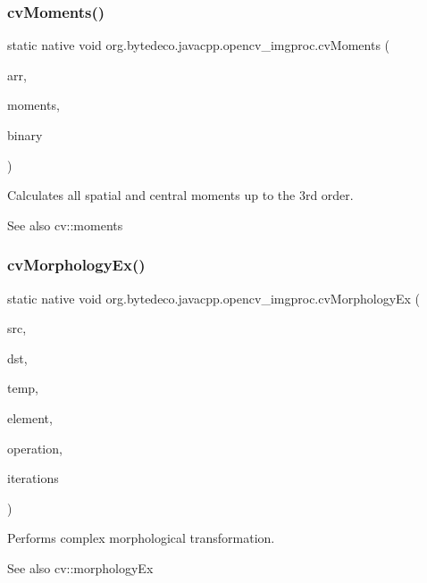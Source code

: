 \subsubsection{\texorpdfstring{cv\+Moments()}{cvMoments()}}
{\footnotesize\ttfamily static native void org.\+bytedeco.\+javacpp.\+opencv\+\_\+imgproc.\+cv\+Moments (\begin{DoxyParamCaption}\item[{@Const Cv\+Arr}]{arr,  }\item[{Cv\+Moments}]{moments,  }\item[{int}]{binary }\end{DoxyParamCaption})\hspace{0.3cm}{\ttfamily [static]}}



Calculates all spatial and central moments up to the 3rd order. 

\begin{DoxySeeAlso}{See also}
cv\+::moments 
\end{DoxySeeAlso}
\mbox{\label{group__imgproc__c_ga09edd651f402b82f067e6de776bbd197}} 
\subsubsection{\texorpdfstring{cv\+Morphology\+Ex()}{cvMorphologyEx()}}
{\footnotesize\ttfamily static native void org.\+bytedeco.\+javacpp.\+opencv\+\_\+imgproc.\+cv\+Morphology\+Ex (\begin{DoxyParamCaption}\item[{@Const Cv\+Arr}]{src,  }\item[{Cv\+Arr}]{dst,  }\item[{Cv\+Arr}]{temp,  }\item[{Ipl\+Conv\+Kernel}]{element,  }\item[{int}]{operation,  }\item[{int}]{iterations }\end{DoxyParamCaption})\hspace{0.3cm}{\ttfamily [static]}}



Performs complex morphological transformation. 

\begin{DoxySeeAlso}{See also}
cv\+::morphology\+Ex 
\end{DoxySeeAlso}
\mbox{\label{group__imgproc__c_ga364a4081ca71e440b95082410d922f9c}} 
